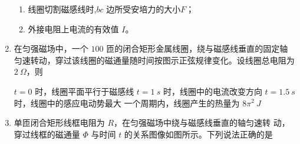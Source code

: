 \begin{enumerate}
\begin{enumerate}
\item 
线圈切割磁感线时,$ bc $ 边所受安培力的大小$ F $；


\item 
外接电阻上电流的有效值 $ I $。


\end{enumerate}
\begin{figure}[h!]
\centering

\end{figure}



\item 
{}
在匀强磁场中，一个 $ 100 $ 匝的闭合矩形金属线圈，绕与磁感线垂直的固定轴
匀速转动，穿过该线圈的磁通量随时间按图示正弦规律变化。设线圈总电阻为 $ 2 \ \Omega $，则  
\begin{figure}[h!]
\centering

\end{figure}

\fourchoices
{$ t=0 $ 时，线圈平面平行于磁感线}
{$ t=1 \ s $ 时，线圈中的电流改变方向}
{$ t=1.5 \ s $ 时，线圈中的感应电动势最大}
{一个周期内，线圈产生的热量为 $ 8 \pi^{2} \ J $}



\item 
{}
单匝闭合矩形线框电阻为 $ R $，在匀强磁场中绕与磁感线垂直的轴匀速转
动，穿过线框的磁通量 $ \Phi $ 与时间 $ t $ 的关系图像如图所示。下列说法正确的是  
\begin{figure}[h!]
\centering
\begin{subfigure}{0.4\linewidth}
\centering
 
\caption{}\label{}
\end{subfigure}
\begin{subfigure}{0.4\linewidth}
\centering
 
\caption{}\label{}
\end{subfigure}
\end{figure}




\end{enumerate}
